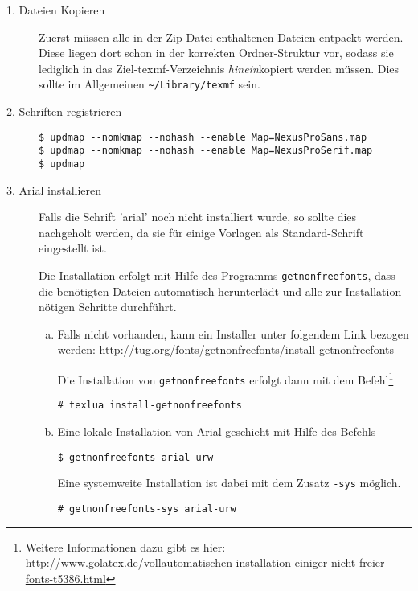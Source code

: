 \begin{description}
  \item[1. Dateien Kopieren] Zuerst müssen alle in der Zip-Datei enthaltenen
    Dateien entpackt werden.
    Diese liegen dort schon in der korrekten Ordner-Struktur vor, sodass
    sie lediglich in das Ziel-texmf-Verzeichnis \emph{hinein}kopiert werden
    müssen.
    Dies sollte im Allgemeinen \lstinline{~/Library/texmf} sein.

  \item[2. Schriften registrieren]\hfill
    \begin{lstlisting}
$ updmap --nomkmap --nohash --enable Map=NexusProSans.map
$ updmap --nomkmap --nohash --enable Map=NexusProSerif.map
$ updmap
    \end{lstlisting}


  \item[3. Arial installieren]
    Falls die Schrift 'arial' noch nicht installiert wurde, so sollte dies
    nachgeholt werden, da sie für einige Vorlagen als Standard-Schrift
    eingestellt ist.
    
    Die Installation erfolgt mit Hilfe des Programms \lstinline{getnonfreefonts},
    dass die benötigten Dateien automatisch herunterlädt und alle zur Installation
    nötigen Schritte durchführt.
    \begin{enumerate}[a)]
      \item Falls nicht vorhanden, kann ein Installer unter folgendem Link
        bezogen werden:
        \url{http://tug.org/fonts/getnonfreefonts/install-getnonfreefonts}
    
        Die Installation von \lstinline{getnonfreefonts} erfolgt dann mit dem
        Befehl\footnote{Weitere Informationen dazu gibt es hier:\\
          \url{http://www.golatex.de/vollautomatischen-installation-einiger-nicht-freier-fonts-t5386.html}}
        \begin{lstlisting}
# texlua install-getnonfreefonts
        \end{lstlisting}
        
      \item Eine lokale Installation von Arial geschieht mit Hilfe des Befehls
    \begin{lstlisting}
$ getnonfreefonts arial-urw
    \end{lstlisting}
    
    Eine systemweite Installation ist dabei mit dem Zusatz \lstinline{-sys}
    möglich.
    \begin{lstlisting}
# getnonfreefonts-sys arial-urw
    \end{lstlisting}
    \end{enumerate}

\end{description}



